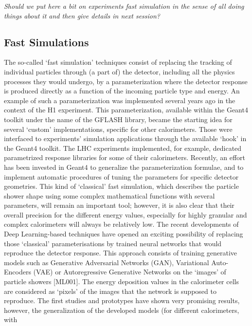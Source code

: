 \documentclass[11pt,a4paper]{article}
\begin{document}
\emph{Should we put here a bit on experiments fast simulation in the
sense of all doing things about it and then give details in next
session?}

\hypertarget{fast-simulations}{%
\subsection{Fast Simulations}\label{fast-simulations}}

The so-called `fast simulation' techniques consist of replacing the
tracking of individual particles through (a part of) the detector,
including all the physics processes they would undergo, by a
parameterization where the detector response is produced directly as a
function of the incoming particle type and energy. An example of such a
parameterization was implemented several years ago in the context of the
H1 experiment. This parameterization, available within the Geant4
toolkit under the name of the GFLASH library, became the starting idea
for several `custom' implementations, specific for other calorimeters.
Those were interfaced to experiments' simulation applications through
the available `hook' in the Geant4 toolkit. The LHC experiments
implemented, for example, dedicated parametrized response libraries for
some of their calorimeters. Recently, an effort has been invested in
Geant4 to generalize the parameterization formulae, and to implement
automatic procedures of tuning the parameters for specific detector
geometries. This kind of `classical' fast simulation, which describes
the particle shower shape using some complex mathematical functions with
several parameters, will remain an important tool; however, it is also
clear that their overall precision for the different energy values,
especially for highly granular and complex calorimeters will always be
relatively low. The recent developments of Deep Learning-based
techniques have opened an exciting possibility of replacing those
`classical' parameterisations by trained neural networks that would
reproduce the detector response. This approach consists of training
generative models such as Generative Adversarial Networks (GAN),
Variational Auto-Encoders (VAE) or Autoregressive Generative Networks on
the `images' of particle showers {[}ML001{]}. The energy deposition
values in the calorimeter cells are considered as `pixels' of the images
that the network is supposed to reproduce. The first studies and
prototypes have shown very promising results, however, the
generalization of the developed models (for different calorimeters, with
\end{document}
